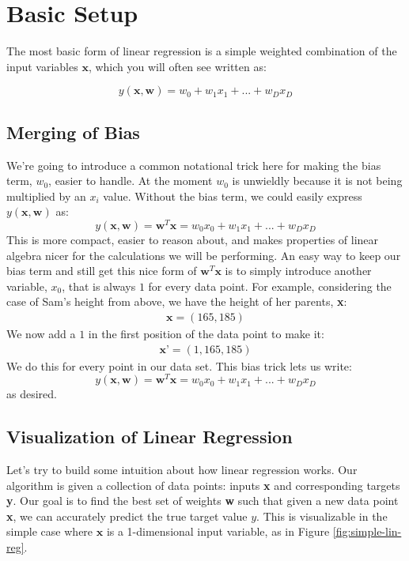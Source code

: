 \section{Basic Setup}
The most basic form of linear regression is a simple weighted combination of the input variables $\textbf{x}$, which you will often see written as:

\begin{equation}
    y(\textbf{x}, \textbf{w}) = w_{0} + w_{1}x_{1} + ... + w_{D}x_{D}
\end{equation}

\subsection{Merging of Bias}
We're going to introduce a common notational trick here for making the bias term, $w_{0}$, easier to handle. At the moment $w_{0}$ is unwieldly because it is not being multiplied by an $x_{i}$ value. Without the bias term, we could easily express $y(\textbf{x}, \textbf{w})$ as:
\begin{equation}
    y(\textbf{x}, \textbf{w}) = \textbf{w}^{T}\textbf{x} = w_{0}x_{0} + w_{1}x_{1} + ... + w_{D}x_{D}
\end{equation}
 This is more compact, easier to reason about, and makes properties of linear algebra nicer for the calculations we will be performing. An easy way to keep our bias term and still get this nice form of $\textbf{w}^{T}\textbf{x}$ is to simply introduce another variable, $x_{0}$, that is always $1$ for every data point. For example, considering the case of Sam's height from above, we have the height of her parents, \textbf{x}:
\begin{align*}
    \textbf{x} = (165, 185)
\end{align*}
We now add a $1$ in the first position of the data point to make it:
\begin{align*}
    \textbf{x'} = (1, 165, 185)
\end{align*}
We do this for every point in our data set. This bias trick lets us write:
\begin{equation}
    y(\textbf{x}, \textbf{w}) = \textbf{w}^{T}\textbf{x} = w_{0}x_{0} + w_{1}x_{1} + ... + w_{D}x_{D}
\end{equation}
as desired.

\subsection{Visualization of Linear Regression}
Let's try to build some intuition about how linear regression works. Our algorithm is given a collection of data points: inputs \textbf{x} and corresponding targets \textbf{y}. Our goal is to find the best set of weights \textbf{w} such that given a new data point \textbf{x}, we can accurately predict the true target value $y$. This is visualizable in the simple case where $\textbf{x}$ is a 1-dimensional input variable, as in Figure \ref{fig:simple-lin-reg}.

